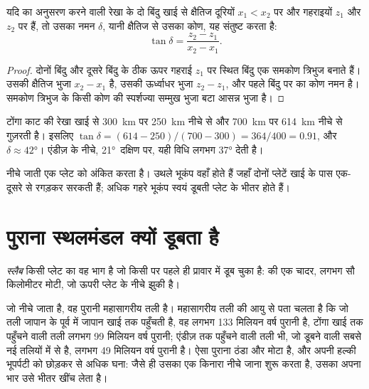 \begin{proposition}[भूकंप-काट से स्लैब का नमन]\label{prop:g11:subduction-zones:dip}
यदि  का अनुसरण करने वाली रेखा के दो बिंदु खाई से
क्षैतिज दूरियों $x_1 < x_2$ पर और गहराइयों $z_1$ और $z_2$ पर हैं,
तो उसका नमन $\delta$, यानी क्षैतिज से उसका कोण, यह संतुष्ट करता है:
\[
  \tan \delta = \frac{z_2 - z_1}{x_2 - x_1}.
\]
\end{proposition}

\begin{proof}
दोनों बिंदु और दूसरे बिंदु के ठीक ऊपर गहराई $z_1$ पर स्थित बिंदु
एक समकोण त्रिभुज बनाते हैं। उसकी क्षैतिज भुजा $x_2 - x_1$ है, उसकी ऊर्ध्वाधर भुजा
$z_2 - z_1$, और पहले बिंदु पर का कोण नमन है। समकोण त्रिभुज के किसी
कोण की स्पर्शज्या सम्मुख भुजा बटा आसन्न भुजा है।
\end{proof}

\begin{example}[टोंगा के नीचे नमन]\label{ex:g11:subduction-zones:dip}
टोंगा काट की रेखा खाई से \qty{300}{km} पर \qty{250}{km} नीचे से
और \qty{700}{km} पर \qty{614}{km} नीचे से गुज़रती है। इसलिए
$\tan\delta = (614 - 250)/(700 - 300) = 364/400 = 0.91$, और
$\delta \approx \ang{42}$। एंडीज़ के नीचे, \ang{21}~दक्षिण पर, यही
विधि लगभग \ang{37} देती है।
\end{example}

 नीचे जाती एक प्लेट को अंकित करता है। उथले भूकंप
वहाँ होते हैं जहाँ दोनों प्लेटें खाई के पास एक-दूसरे से रगड़कर सरकती हैं; अधिक गहरे
भूकंप स्वयं डूबती प्लेट के भीतर होते हैं।

\section{पुराना स्थलमंडल क्यों डूबता है}

\begin{definition}[स्लैब]\label{def:g11:subduction-zones:slab}
\emph{स्लैब} किसी प्लेट का वह भाग है जो किसी  पर
पहले ही प्रावार में डूब चुका है:  की एक चादर, लगभग
सौ किलोमीटर मोटी, जो ऊपरी प्लेट के नीचे झुकी है।
\end{definition}

जो नीचे जाता है, वह पुरानी महासागरीय तली है। महासागरीय तली की आयु से पता चलता है कि जो तली
जापान के पूर्व में जापान खाई तक पहुँचती है, वह लगभग 133 मिलियन वर्ष पुरानी है,
टोंगा खाई तक पहुँचने वाली तली लगभग 99 मिलियन वर्ष पुरानी; एंडीज़ तक पहुँचने वाली तली भी,
जो डूबने वाली सबसे नई तलियों में से है, लगभग 49
मिलियन वर्ष पुरानी है। ऐसा पुराना  ठंडा और मोटा है, और अपनी
हल्की भूपर्पटी को छोड़कर  से अधिक घना: जैसे ही उसका एक किनारा
नीचे जाना शुरू करता है, उसका अपना भार उसे भीतर खींच लेता है।

